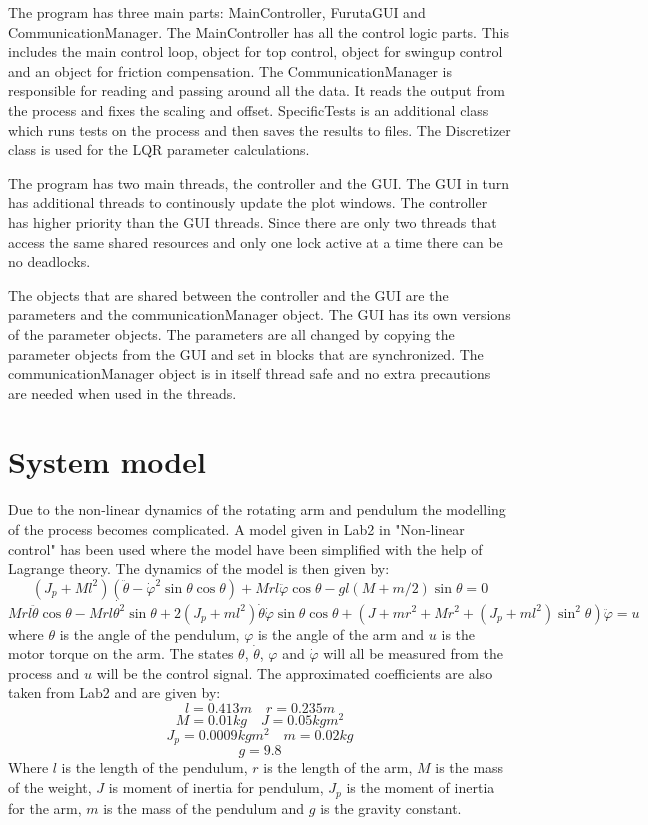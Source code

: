 \documentclass[10pt,a4paper]{article}
\begin{document}

The program has three main parts: MainController, FurutaGUI and CommunicationManager. The MainController has all the control logic parts. This includes the main control loop, object for top control, object for swingup control and an object for friction compensation. The CommunicationManager is responsible for reading and passing around all the data. It reads the output from the process and fixes the scaling and offset. SpecificTests is an additional class which runs tests on the process and then saves the results to files. The Discretizer class is used for the LQR parameter calculations.

The program has two main threads, the controller and the GUI. The GUI in turn has additional threads to continously update the plot windows. The controller has higher priority than the GUI threads. Since there are only two threads that access the same shared resources and only one lock active at a time there can be no deadlocks.

The objects that are shared between the controller and the GUI are the parameters and the communicationManager object. The GUI has its own versions of the parameter objects. The parameters are all changed by copying the parameter objects from the GUI and set in blocks that are synchronized. The communicationManager object is in itself thread safe and no extra precautions are needed when used in the threads.


\section{System model}
Due to the non-linear dynamics of the rotating arm and pendulum the modelling of the process becomes complicated. A model given in Lab2 in "Non-linear control" has been used where the model have been simplified with the help of Lagrange theory. The dynamics of the model is then given by:
$$(J_p + Ml^2)(\ddot{\theta} - \dot{\varphi} ^2\sin\theta \cos\theta )+Mrl\ddot{\varphi}\cos\theta-gl(M+m/2)\sin\theta = 0 $$
\begin{equation}
Mrl\ddot{\theta}\cos\theta - Mrl\dot{\theta ^2}\sin\theta + 2(J_p + ml^2 ) \dot{\theta} \dot{\varphi}\sin\theta \cos\theta + (J+mr^2 + Mr^2 + (J_p+ml^2)\sin^2\theta)\ddot{\varphi}=u
\label{eq:model}
\end{equation}
where $\theta$ is the angle of the pendulum, $\varphi$ is the angle of the arm and $u$ is the motor torque on the arm. The states $\theta$, $\dot{\theta}$, $\varphi$ and $\dot{\varphi}$ will all be measured from the process and $u$ will be the control signal. The approximated coefficients are also taken from Lab2 and are given by:
$$l=0.413m \quad  r=0.235m$$
$$M=0.01kg \quad J=0.05kgm^2$$
$$J_p=0.0009kgm^2 \quad m=0.02kg$$
$$ g=9.8$$
Where $l$ is the length of the pendulum, $r$ is the length of the arm, $M$ is the mass of the weight, $J$ is moment of inertia  for pendulum, $J_p$ is the moment of inertia for the arm, $m$ is the mass of the pendulum and $g$ is the gravity constant.
\end{document}
